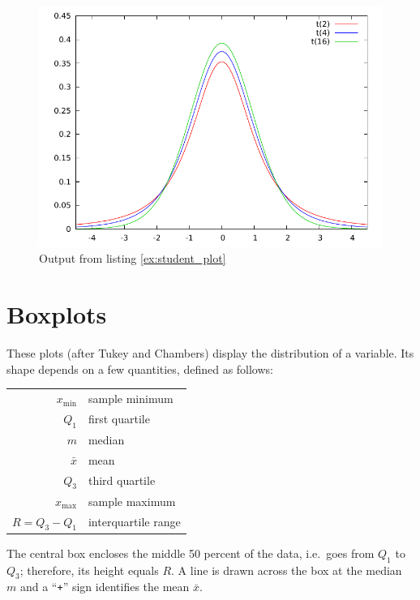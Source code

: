 \begin{figure}[htbp]
  \centering
  \includegraphics{figures/StudentPlot}
  \caption{Output from listing \ref{ex:student_plot}}
  \label{fig:StudentPlot}
\end{figure}


\pagebreak[4]

\section{Boxplots}
\label{sect-boxplots}

These plots (after Tukey and Chambers) display the distribution of a
variable. Its shape depends on a few quantities, defined as follows:

\begin{center}
\begin{tabular}{rl}
  $x_{\mathrm{min}}$ & sample minimum \\
  $Q_1$ & first quartile \\
  $m$ & median \\
  $\bar{x}$ & mean \\
  $Q_3$ & third quartile \\
  $x_{\mathrm{max}}$ & sample maximum\\
  $R = Q_3 - Q_1$ & interquartile range\\
\end{tabular}
\end{center}

The central box encloses the middle 50 percent of the data, i.e.\ goes
from $Q_1$ to $Q_3$; therefore, its height equals $R$.  A line
is drawn across the box at the median $m$ and a ``\texttt{+}'' sign
identifies the mean $\bar{x}$.

